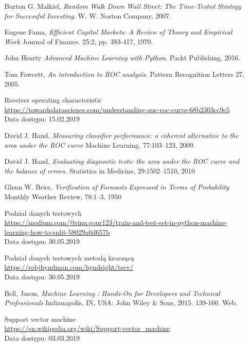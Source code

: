 \documentclass[a4paper, twoside, 11pt, openright]{article}
\begin{document}
\begin{thebibliography}{9}
  Burton G. Malkiel,
  \textit{Random Walk Down Wall Street: The Time-Tested Strategy for Successful Investing}.
  W. W. Norton Company,
  2007.

  Eugene Fama,
  \textit{Efficient Capital Markets: A Review of Theory and Empirical Work}
  Journal of Finance. 25:2, pp. 383-417, 1970.

  John Hearty
  \textit{Advanced Machine Learning with Python}.
  Packt Publishing,
  2016.

	Tom Fawcett, 
  \textit{An introduction to ROC analysis.}
  Pattern Recognition Letters 27,
  2005.

	Receiver operating characteristic
	\\\url{https://towardsdatascience.com/understanding-auc-roc-curve-68b2303cc9c5} 
	\\Data dostępu: 15.02.2019

	David J. Hand, 
  \textit{Measuring classifier performance: a coherent alternative to the area under the ROC curve}
  Machine Learning, 77:103–123, 2009.

	David J. Hand, 
  \textit{Evaluating diagnostic tests: the area under the ROC curve and the balance of errors.}
 Statistics in Medicine, 29:1502–1510, 2010

	Glenn W. Brier, 
  \textit{Verification of Forecasts Expressed in Terms of Probability}
  Monthly Weather Review, 78:1–3, 1950

 Podział danych testowych 
 \\\url{https://medium.com/@rinu.gour123/train-and-test-set-in-python-machine-learning-how-to-split-58029a0d657b} 
 \\Data dostępu: 30.05.2019
 
 
 Podział danych testowych metodą kroczącą 
 \\\url{https://robjhyndman.com/hyndsight/tscv/}
\\Data dostępu: 30.05.2019
 
	Bell, Jason, \textit{Machine Learning : Hands-On for Developers and Technical Professionals}  Indianapolis, IN, USA: John Wiley \& Sons, 2015. 139-160. Web.
	
	Support vector machine
	\\\url{https://en.wikipedia.org/wiki/Support-vector_machine} 
	\\Data dostępu: 03.03.2019


\end{thebibliography}
\end{document}
